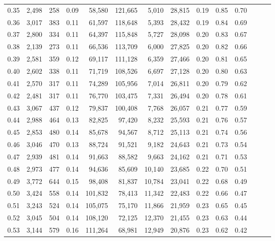\begin{tabular}{rrrrrrrrrrrrrr}
0.35 &  2,498 &  258 &  0.09 &   58,580 &  121,665 &   5,010 &  28,815 &  0.19 &  0.85 &      0.70 \\
0.36 &  3,017 &  383 &  0.11 &   61,597 &  118,648 &   5,393 &  28,432 &  0.19 &  0.84 &      0.69 \\
0.37 &  2,800 &  334 &  0.11 &   64,397 &  115,848 &   5,727 &  28,098 &  0.20 &  0.83 &      0.67 \\
0.38 &  2,139 &  273 &  0.11 &   66,536 &  113,709 &   6,000 &  27,825 &  0.20 &  0.82 &      0.66 \\
0.39 &  2,581 &  359 &  0.12 &   69,117 &  111,128 &   6,359 &  27,466 &  0.20 &  0.81 &      0.65 \\
0.40 &  2,602 &  338 &  0.11 &   71,719 &  108,526 &   6,697 &  27,128 &  0.20 &  0.80 &      0.63 \\
0.41 &  2,570 &  317 &  0.11 &   74,289 &  105,956 &   7,014 &  26,811 &  0.20 &  0.79 &      0.62 \\
0.42 &  2,481 &  317 &  0.11 &   76,770 &  103,475 &   7,331 &  26,494 &  0.20 &  0.78 &      0.61 \\
0.43 &  3,067 &  437 &  0.12 &   79,837 &  100,408 &   7,768 &  26,057 &  0.21 &  0.77 &      0.59 \\
0.44 &  2,988 &  464 &  0.13 &   82,825 &   97,420 &   8,232 &  25,593 &  0.21 &  0.76 &      0.57 \\
0.45 &  2,853 &  480 &  0.14 &   85,678 &   94,567 &   8,712 &  25,113 &  0.21 &  0.74 &      0.56 \\
0.46 &  3,046 &  470 &  0.13 &   88,724 &   91,521 &   9,182 &  24,643 &  0.21 &  0.73 &      0.54 \\
0.47 &  2,939 &  481 &  0.14 &   91,663 &   88,582 &   9,663 &  24,162 &  0.21 &  0.71 &      0.53 \\
0.48 &  2,973 &  477 &  0.14 &   94,636 &   85,609 &  10,140 &  23,685 &  0.22 &  0.70 &      0.51 \\
0.49 &  3,772 &  644 &  0.15 &   98,408 &   81,837 &  10,784 &  23,041 &  0.22 &  0.68 &      0.49 \\
0.50 &  3,424 &  558 &  0.14 &  101,832 &   78,413 &  11,342 &  22,483 &  0.22 &  0.66 &      0.47 \\
0.51 &  3,243 &  524 &  0.14 &  105,075 &   75,170 &  11,866 &  21,959 &  0.23 &  0.65 &      0.45 \\
0.52 &  3,045 &  504 &  0.14 &  108,120 &   72,125 &  12,370 &  21,455 &  0.23 &  0.63 &      0.44 \\
0.53 &  3,144 &  579 &  0.16 &  111,264 &   68,981 &  12,949 &  20,876 &  0.23 &  0.62 &      0.42 \\

\end{tabular}
